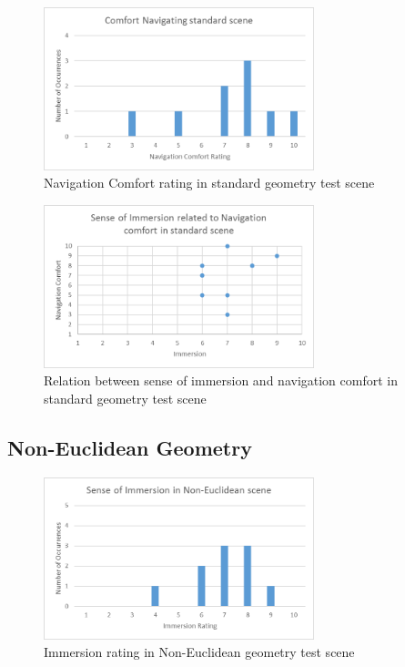 			\begin{figure}
				\label{exp:fig:standard_comfort}
				\includegraphics[width=0.7\textwidth]{Images/Standard_Comfort}
				\centering
				\caption{Navigation Comfort rating in standard geometry test scene}
			\end{figure}

			\begin{figure}
				\label{exp:fig:standard_relation}
				\includegraphics[width=0.7\textwidth]{Images/Standard_Relation}
				\centering
				\caption{Relation between sense of immersion and navigation comfort in standard geometry test scene}
			\end{figure}

		\subsection{Non-Euclidean Geometry}
		\label{exp:exp:ne}


			\begin{figure}
				\label{exp:fig:ne_immersion}
				\includegraphics[width=0.7\textwidth]{Images/NE_Immersion}
				\centering
				\caption{Immersion rating in Non-Euclidean geometry test scene}
			\end{figure}

